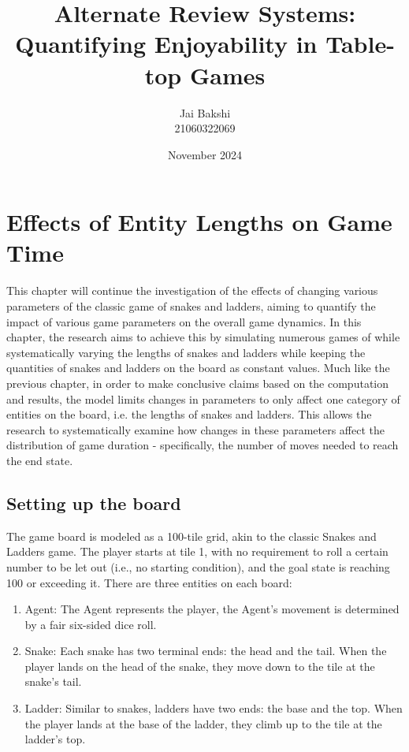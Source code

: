 \documentclass[12pt]{report}
\title{Alternate Review Systems:\\ Quantifying Enjoyability in Table-top Games}
\author{Jai Bakshi \\ 21060322069}
\date{November 2024}
\begin{document}
	\maketitle
	\setcounter{chapter}{1}
	\chapter{Effects of Entity Lengths on Game Time}
	This chapter will continue the investigation of the effects of changing various parameters of the classic game of snakes and ladders, aiming to quantify the impact of various game parameters on the overall game dynamics. In this chapter, the research aims to achieve this by simulating numerous games of while systematically varying the lengths of snakes and ladders while keeping the quantities of snakes and ladders on the board as constant values. Much like the previous chapter, in order to make conclusive claims based on the computation and results, the model limits changes in parameters to only affect one category of entities on the board, i.e. the lengths of snakes and ladders. This allows the research to systematically examine how changes in these parameters affect the distribution of game duration - specifically, the number of moves needed to reach the end state.
	
	\section{Setting up the board}
	The game board is modeled as a 100-tile grid, akin to the classic Snakes and Ladders game. The player starts at tile 1, with no requirement to roll a certain number to be let out (i.e., no starting condition), and the goal state is reaching 100 or exceeding it. There are three entities on each board:

	\begin{enumerate}
		\item Agent: The Agent represents the player, the Agent's movement is determined by a fair six-sided dice roll. 
		\item Snake: Each snake has two terminal ends: the head and the tail. When the player lands on the head of the snake, they move down to the tile at the snake's tail.
		\item Ladder: Similar to snakes, ladders have two ends: the base and the top. When the player lands at the base of the ladder, they climb up to the tile at the ladder's top.
	\end{enumerate}
\end{document}
